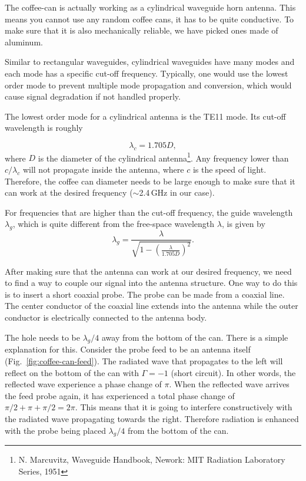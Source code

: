 \documentclass[letterpaper, 11pt]{article}
\begin{document}
The coffee-can is actually working as a cylindrical waveguide horn antenna. This means you cannot use any random coffee cans, it has to be quite conductive. To make sure that it is also mechanically reliable, we have picked ones made of aluminum. 

Similar to rectangular waveguides, cylindrical waveguides have many modes and each mode has a specific cut-off frequency. Typically, one would use the lowest order mode to prevent multiple mode propagation and conversion, which would cause signal degradation if not handled properly. 

The lowest order mode for a cylindrical antenna is the TE11 mode. Its cut-off wavelength is roughly 

\[
\lambda_c = 1.705 D,
\]
where $D$ is the diameter of the cylindrical antenna\footnote{N. Marcuvitz, Waveguide Handbook, Nework: MIT Radiation Laboratory Series, 1951}. Any frequency lower than $c/\lambda_c$ will not propagate inside the antenna, where $c$ is the speed of light. Therefore, the coffee can diameter needs to be large enough to make sure that it can work at the desired frequency ($\sim$2.4\,GHz in our case). 

For frequencies that are higher than the cut-off frequency, the guide wavelength $\lambda_g$, which is quite different from the free-space wavelength $\lambda$, is given by 
\[
	\lambda_g= \frac{\lambda}{\displaystyle \sqrt{1-\left( \frac{\lambda}{\displaystyle  1.705D} \right)^2}}.
\]

After making sure that the antenna can work at our desired frequency, we need to find a way to couple our signal into the antenna structure. One way to do this is to insert a short coaxial probe. The probe can be made from a coaxial line. The center conductor of the coaxial line extends into the antenna while the outer conductor is electrically connected to the antenna body. 

The hole needs to be $\lambda_g/4$ away from the bottom of the can. There is a simple explanation for this. Consider the probe feed to be an antenna itself (Fig.~\ref{fig:coffee-can-feed}). The radiated wave that propagates to the left will reflect on the bottom of the can with $\Gamma =-1$ (short circuit). In other words, the reflected wave experience a phase change of $\pi$. When the reflected wave arrives the feed probe again, it has experienced a total phase change of $\pi/2 + \pi + \pi/2 = 2 \pi$. This means that it is going to interfere constructively with the radiated wave propagating towards the right. Therefore radiation is enhanced with the probe being placed $\lambda_g/4$ from the bottom of the can. 
\end{document}
